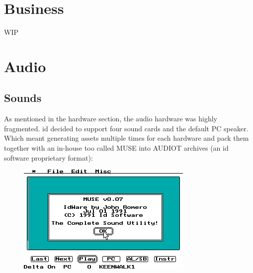 \documentclass[book.tex]{subfiles}
\begin{document}
\section{Business}
WIP\\














\section{Audio}

\subsection{Sounds}
As mentioned in the hardware section, the audio hardware was highly fragmented. id decided to support four sound cards and the default PC speaker. Which meant generating assets multiple times for each hardware and pack them together with an in-house too called MUSE into AUDIOT archives (an id software proprietary format):\\
\begin{figure}[H]
\centering
 \includegraphics[width=\textwidth]{imgs/muse.png}
 \end{figure}
 \par
\end{document}

